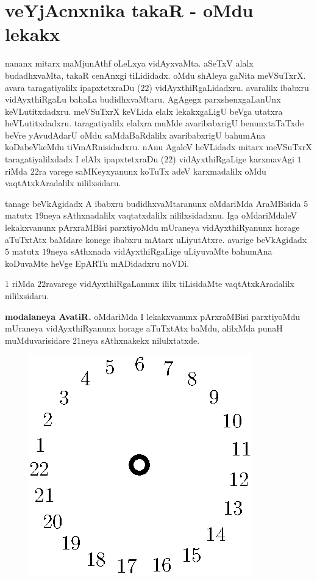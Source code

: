 \chapter{veYjAcnxnika takaR - oMdu lekakx}

nananx mitarx maMjunAthf oLeLxya vidAyxvaMta. aSeTxV alalx budadhxvaMta, takaR cenAnxgi tiLididadx. oMdu shAleya gaNita meVSuTxrX. avara taragatiyalilx ipapxtetxraDu ($22$) vidAyxthiRgaLidadxru. avaralilx ibabxru vidAyxthiRgaLu bahaLa budidhxvaMtaru. AgAgegx parxshenxgaLanUnx keVLutitxdadxru. meVSuTxrX keVLida elalx lekakxgaLigU beVga utatxra heVLutitxdadxru. taragatiyalilx elalxra muMde avaribabxrigU benunxtaTaTxde beVre yAvudAdarU oMdu saMdaBaRdalilx avaribabxrigU bahumAna koDabeVkeMdu tiVmARnisidadxru. nAnu AgaleV heVLidadx mitarx meVSuTxrX taragatiyalilxdadx I elAlx ipapxtetxraDu ($22$) vidAyxthiRgaLige karxmavAgi $1$ riMda $22$ra varege saMKeyxyanunx koTuTx adeV karxmadalilx oMdu vaqtAtxkAradalilx nililxsidaru.

tanage beVkAgidadx A ibabxru budidhxvaMtaranunx oMdariMda AraMBisida $5$ matutx $19$neya sAthxnadalilx vaqtatxdalilx nililxsidadxnu. Iga oMdariMdaleV lekakxvanunx pArxraMBisi parxtiyoMdu mUraneya vidAyxthiRyanunx horage aTuTxtAtx baMdare konege ibabxru mAtarx uLiyutAtxre. avarige beVkAgidadx $5$ matutx $19$neya sAthxnada vidAyxthiRgaLige uLiyuvaMte bahumAna koDuvaMte heVge EpARTu mADidadxru noVDi.

$1$ riMda $22$ravarege vidAyxthiRgaLanunx ililx tiLisidaMte vaqtAtxkAradalilx nililxsidaru.

{\bf modalaneya AvatiR.} oMdariMda I lekakxvanunx pArxraMBisi parxtiyoMdu mUraneya vidAyxthiRyanunx horage aTuTxtAtx baMdu, alilxMda punaH muMduvarisidare $21$neya sAthxnakekx nilulxtatxde.
\begin{figure}[H]
\centering
\includegraphics[scale=0.8]{src/figures/fig8.eps}
\end{figure}

